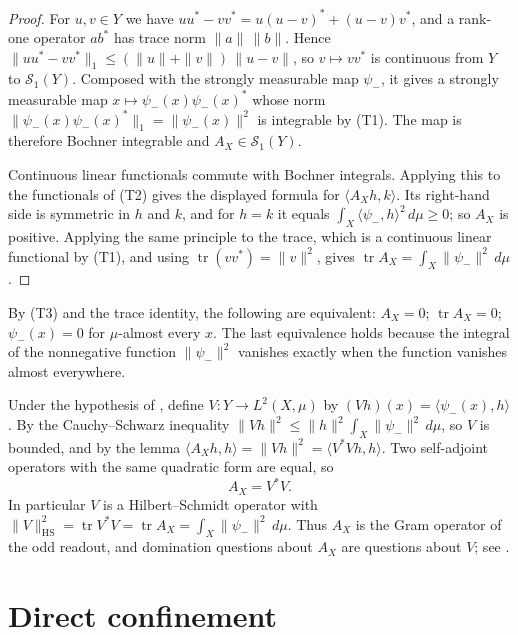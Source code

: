 \documentclass[11pt]{article}
\DeclareMathOperator{\trace}{tr}
\newcommand{\psim}{\psi_{-}}
\newcommand{\AX}{A_{X}}
\theoremstyle{definition}
\begin{document}
\begin{proof}
For \(u,v\in Y\) we have \(uu^*-vv^*=u(u-v)^*+(u-v)v^*\), and a
rank-one operator \(ab^*\) has trace norm \(\|a\|\,\|b\|\).  Hence
\(\|uu^*-vv^*\|_1\leq(\|u\|+\|v\|)\,\|u-v\|\), so \(v\mapsto vv^*\) is
continuous from \(Y\) to \(\mathcal S_1(Y)\).  Composed with the
strongly measurable map \(\psim\), it gives a strongly measurable map
\(x\mapsto\psim(x)\psim(x)^*\) whose norm
\(\|\psim(x)\psim(x)^*\|_1=\|\psim(x)\|^2\) is integrable by (T1).
The map is therefore Bochner integrable and \(\AX\in\mathcal S_1(Y)\).

Continuous linear functionals commute with Bochner integrals.  Applying
this to the functionals of (T2) gives the displayed formula for
\(\langle\AX h,k\rangle\).  Its right-hand side is symmetric in \(h\)
and \(k\), and for \(h=k\) it equals
\(\int_X\langle\psim,h\rangle^2\,d\mu\geq0\); so \(\AX\) is positive.
Applying the same principle to the trace, which is a continuous linear
functional by (T1), and using \(\trace(vv^*)=\|v\|^2\), gives
\(\trace\AX=\int_X\|\psim\|^2\,d\mu\).
\end{proof}

By (T3) and the trace identity, the following are equivalent:
\(\AX=0\); \(\trace\AX=0\); \(\psim(x)=0\) for \(\mu\)-almost every
\(x\).  The last equivalence holds because the integral of the
nonnegative function \(\|\psim\|^2\) vanishes exactly when the function
vanishes almost everywhere.

\begin{remark}
\label{rem:duality_confinement:analysis-operator}
Under the hypothesis of ,
define \(V:Y\to L^2(X,\mu)\) by \((Vh)(x)=\langle\psim(x),h\rangle\).
By the Cauchy--Schwarz inequality
\(\|Vh\|^2\leq\|h\|^2\int_X\|\psim\|^2\,d\mu\), so \(V\) is bounded, and
by the lemma \(\langle\AX h,h\rangle=\|Vh\|^2=\langle V^*Vh,h\rangle\).
Two self-adjoint operators with the same quadratic form are equal, so
\[
  \AX=V^*V.
\]
In particular \(V\) is a Hilbert--Schmidt operator with
\(\|V\|_{\mathrm{HS}}^2=\trace V^*V=\trace\AX=\int_X\|\psim\|^2\,d\mu\).
Thus \(\AX\) is the Gram operator of the odd readout, and domination
questions about \(\AX\) are questions about \(V\); see
.
\end{remark}
 \section{Direct confinement}
\label{sec:direct_confinement}
\end{document}

